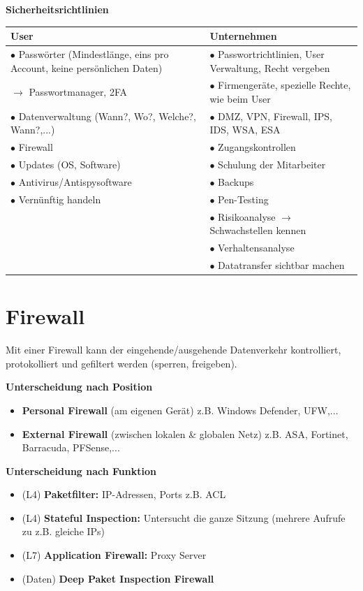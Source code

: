\textbf{Sicherheitsrichtlinien} \\
\begin{tabular}{ | p{} | p{} |} \hline
	\textbf{User} & \textbf{Unternehmen} \\ \hline
	$\bullet$ Passwörter (Mindestlänge, eins pro Account, keine persönlichen Daten) & $\bullet$ Passwortrichtlinien, User Verwaltung, Recht vergeben \\
	$\rightarrow$ Passwortmanager, 2FA & $\bullet$ Firmengeräte, spezielle Rechte, wie beim User \\
	$\bullet$ Datenverwaltung (Wann?, Wo?, Welche?, Wann?,...) & $\bullet$ DMZ, VPN, Firewall, IPS, IDS, WSA, ESA \\
	$\bullet$ Firewall & $\bullet$ Zugangskontrollen \\
	$\bullet$ Updates (OS, Software) & $\bullet$ Schulung der Mitarbeiter \\
	$\bullet$ Antivirus/Antispysoftware & $\bullet$ Backups \\
	$\bullet$ Vernünftig handeln & $\bullet$ Pen-Testing \\
	 & $\bullet$ Risikoanalyse $\rightarrow$ Schwachstellen kennen \\
	 & $\bullet$ Verhaltensanalyse \\
	 & $\bullet$ Datatransfer sichtbar machen \\
	\hline
\end{tabular} 

\section{Firewall}
Mit einer Firewall kann der eingehende/ausgehende Datenverkehr kontrolliert, protokolliert und gefiltert werden (sperren, freigeben).

\textbf{Unterscheidung nach Position}
\begin{itemize}
	\item \textbf{Personal Firewall} (am eigenen Gerät) z.B. Windows Defender, UFW,...
	\item \textbf{External Firewall} (zwischen lokalen \& globalen Netz) z.B. ASA, Fortinet, Barracuda, PFSense,...
\end{itemize}

\textbf{Unterscheidung nach Funktion}
\begin{itemize}
	\item (L4) \textbf{Paketfilter:} IP-Adressen, Ports z.B. ACL
	\item (L4) \textbf{Stateful Inspection:} Untersucht die ganze Sitzung (mehrere Aufrufe zu z.B. gleiche IPs)
	\item (L7) \textbf{Application Firewall:} Proxy Server
	\item (Daten) \textbf{Deep Paket Inspection Firewall}
\end{itemize}

